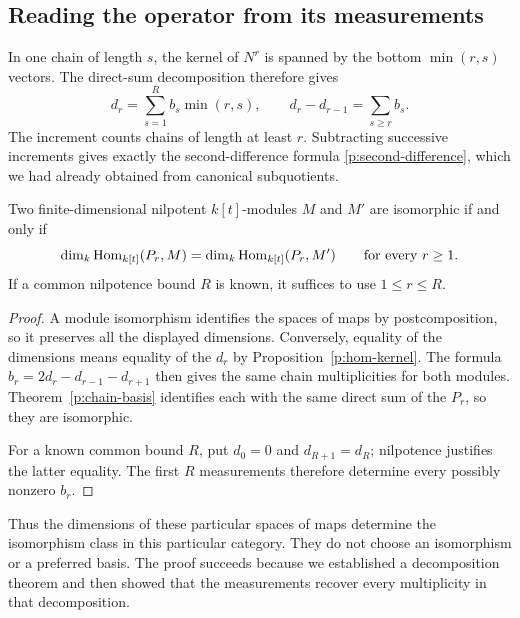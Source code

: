 \subsection{Reading the operator from its measurements}
\label{p:profile-reconstruction}

In one chain of length $s$, the kernel of $N^r$ is spanned by the bottom
$\min(r,s)$ vectors. The direct-sum decomposition therefore gives
\begin{equation}
\label{p:profile-formula}
 d_r=\sum_{s=1}^{R}b_s\min(r,s),\qquad
 d_r-d_{r-1}=\sum_{s\geq r}b_s.
\end{equation}
The increment counts chains of length at least $r$. Subtracting successive
increments gives exactly the second-difference formula
\eqref{p:second-difference}, which we had already obtained from canonical
subquotients.

\begin{corollary}
\label{p:reconstruction}
Two finite-dimensional nilpotent $k[t]$-modules $M$ and $M'$ are isomorphic
if and only if
\[
 \dim_k\operatorname{Hom}_{k[t]}(P_r,M)=\dim_k\operatorname{Hom}_{k[t]}(P_r,M')
 \qquad\text{for every }r\geq1.
\]
If a common nilpotence bound $R$ is known, it suffices to use $1\leq r\leq R$.
\end{corollary}

\begin{proof}
A module isomorphism identifies the spaces of maps by postcomposition,
so it preserves all the displayed dimensions. Conversely, equality of
the dimensions means equality of the $d_r$ by
Proposition~\ref{p:hom-kernel}. The formula
$b_r=2d_r-d_{r-1}-d_{r+1}$ then gives the same chain multiplicities for
both modules. Theorem~\ref{p:chain-basis} identifies each with the same
direct sum of the $P_r$, so they are isomorphic.

For a known common bound $R$, put $d_0=0$ and $d_{R+1}=d_R$; nilpotence
justifies the latter equality. The first $R$ measurements therefore
determine every possibly nonzero $b_r$.
\end{proof}

Thus the dimensions of these particular spaces of maps determine the
isomorphism class in this particular category. They do not choose an
isomorphism or a preferred basis. The proof succeeds because we established
a decomposition theorem and then showed that the measurements recover
every multiplicity in that decomposition.

